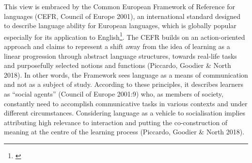 \begin{styleStandard}
This view is embraced by the Common European Framework of Reference for languages (CEFR, Council of Europe 2001), an international standard designed to describe language ability for European languages, which is globally popular especially for its application to English\footnote{\href{../../../../../../../../C:/Users/ssbra/OneDrive/Desktop/Diss\%20for\%20publication/thesis\%20GOOD_EDITING.docx\#_bookmark291}{} \href{../../../../../../../../C:/Users/ssbra/OneDrive/Desktop/Diss\%20for\%20publication/thesis\%20GOOD_EDITING.docx\#_bookmark291}{} \href{../../../../../../../../C:/Users/ssbra/OneDrive/Desktop/Diss\%20for\%20publication/thesis\%20GOOD_EDITING.docx\#_bookmark291}{}}. The CEFR builds on an action-oriented approach and claims to represent a shift away from the idea of learning as a linear progression through abstract language structures, towards real-life tasks and purposefully selected notions and functions (Piccardo, Goodier \& North 2018). In other words, the Framework sees language as a means of communication and not as a subject of study. According to these principles, it describes learners as “social agents” (Council of Europe 2001:9) who, as members of society, constantly need to accomplish communicative tasks in various contexts and under different circumstances. Considering language as a vehicle to socialisation implies attributing high relevance to interaction and putting the co-construction of meaning at the centre of the learning process (Piccardo, Goodier \& North 2018). 
\end{styleStandard}

